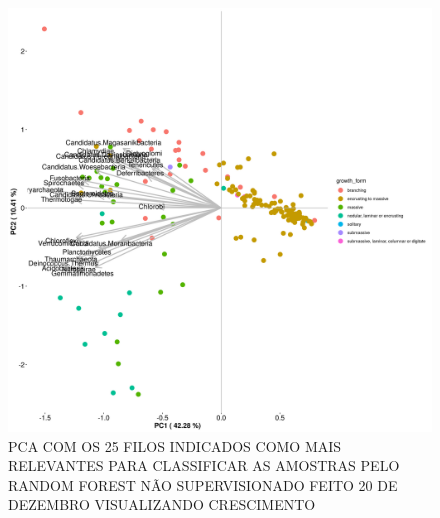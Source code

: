 \documentclass[12pt, a4paper]{report}
\begin{document}
\begin{figure}[H]
	\centering
	\includegraphics[scale=0.4]{figures/PCA_rf_nao_super_25_157_corais_growth_2018_12_20.png}
	\caption{PCA COM OS 25 FILOS INDICADOS COMO MAIS RELEVANTES PARA CLASSIFICAR AS AMOSTRAS PELO RANDOM FOREST NÃO SUPERVISIONADO FEITO 20 DE DEZEMBRO VISUALIZANDO CRESCIMENTO}
	\label{fig: PCA COM OS 25 FILOS INDICADOS COMO MAIS RELEVANTES PARA CLASSIFICAR AS AMOSTRAS PELO RANDOM FOREST NÃO SUPERVISIONADO FEITO 20 DE DEZEMBRO VISUALIZANDO CRESCIMENTO DE CORAIS}
\end{figure}
\end{document}
